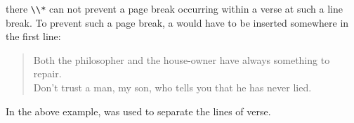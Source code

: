 \begin{Example}
\begin{ShowOutput}
      \end{ShowOutput}
      there \verb|\\*| can not prevent a page break occurring within a verse
      at such a line break. To prevent such a page break, a
       would have to be inserted
      somewhere in the first line:
\begin{lstcode}
  \begin{verse}
    Both the philosopher and the house-owner\nopagebreak
    have always something to repair.\\
    \bigskip
    Don't trust a man, my son, who tells you\nopagebreak
    that he has never lied.
  \end{verse}
\end{lstcode}

      In the above example,  was used to separate the lines of
      verse.
    \end{Example}
  \fi %
  \EndIndexGroup

